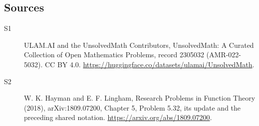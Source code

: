 \documentclass[11pt]{article}
\begin{document}
\subsection{Sources}
\begin{description}
\item[\hypertarget{source:2305032:1}{S1}] ULAM.AI and the UnsolvedMath Contributors, UnsolvedMath: A Curated Collection of Open Mathematics Problems, record 2305032 (AMR-022-5032). CC BY 4.0. \url{https://huggingface.co/datasets/ulamai/UnsolvedMath}.
\item[\hypertarget{source:2305032:2}{S2}] W. K. Hayman and E. F. Lingham, Research Problems in Function Theory (2018), arXiv:1809.07200, Chapter 5, Problem 5.32, its update and the preceding shared notation. \url{https://arxiv.org/abs/1809.07200}.
\end{description}
\label{end:2305032}
\end{document}
